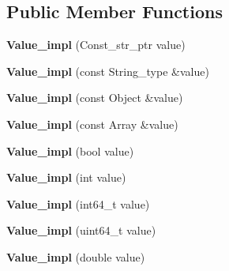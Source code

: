 \subsection*{Public Member Functions}
\begin{DoxyCompactItemize}
\item 
\mbox{\label{classjson__spirit_1_1_value__impl_af8b77ab064e9c02489d9d46a4b5016c7}} 
{\bfseries Value\+\_\+impl} (Const\+\_\+str\+\_\+ptr value)
\item 
\mbox{\label{classjson__spirit_1_1_value__impl_a7889697fdaa2b1ea4bca8d19f674895a}} 
{\bfseries Value\+\_\+impl} (const String\+\_\+type \&value)
\item 
\mbox{\label{classjson__spirit_1_1_value__impl_a2541833e48992aaaba12029ec8356d91}} 
{\bfseries Value\+\_\+impl} (const Object \&value)
\item 
\mbox{\label{classjson__spirit_1_1_value__impl_a33eab7dc7eec340ae0550a3814ca09ab}} 
{\bfseries Value\+\_\+impl} (const Array \&value)
\item 
\mbox{\label{classjson__spirit_1_1_value__impl_a2eae67e7a135d8982a87841743e72490}} 
{\bfseries Value\+\_\+impl} (bool value)
\item 
\mbox{\label{classjson__spirit_1_1_value__impl_abb1e6d790ca2699976047e91dda40f8f}} 
{\bfseries Value\+\_\+impl} (int value)
\item 
\mbox{\label{classjson__spirit_1_1_value__impl_aecde1fa0dc088a1929801b41a4d49f5f}} 
{\bfseries Value\+\_\+impl} (int64\+\_\+t value)
\item 
\mbox{\label{classjson__spirit_1_1_value__impl_a484b93cc4e6aab8313677398df0100c6}} 
{\bfseries Value\+\_\+impl} (uint64\+\_\+t value)
\item 
\mbox{\label{classjson__spirit_1_1_value__impl_aea4b49daa48cf31553c14c722cef1bd9}} 
{\bfseries Value\+\_\+impl} (double value)

\end{DoxyCompactItemize}
